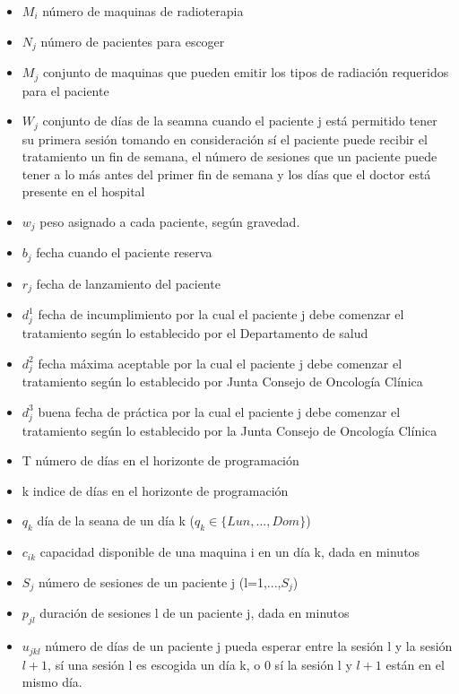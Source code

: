 \documentclass[letter, 10pt]{article}
\begin{document}
\begin{itemize}
    \item $M_{i}$ número de maquinas de radioterapia
    \item $N_{j}$ número de pacientes para escoger
    \item $M_{j}$ conjunto de maquinas que pueden emitir los tipos de radiación requeridos para el paciente
    \item $W_{j}$ conjunto de días de la seamna cuando el paciente j está permitido tener su primera sesión tomando en consideración sí el paciente puede recibir el tratamiento un fin de semana, el número de sesiones que un paciente puede tener a lo más antes del primer fin de semana y los días que el doctor está presente en el hospital
    \item $w_{j}$ peso asignado a cada paciente, según gravedad.
    \item $b_{j}$ fecha cuando el paciente reserva
    \item $r_{j}$ fecha de lanzamiento del paciente
    \item $d_{j}^{1}$ fecha de incumplimiento por la cual el paciente j debe comenzar el tratamiento según lo establecido por el Departamento
de salud
    \item $d_{j}^{2}$ fecha máxima aceptable por la cual el paciente j debe comenzar el tratamiento según lo establecido por Junta Consejo de Oncología Clínica
    \item $d_{j}^{3}$ buena fecha de práctica por la cual el paciente j debe comenzar el tratamiento según lo establecido por la Junta
Consejo de Oncología Clínica
    \item T número de días en el horizonte de programación
    \item k indice de días en el horizonte de programación
    \item $q_{k}$ día de la seana de un día k ($q_{k} \in \{Lun,...,Dom\}$)
    \item $c_{ik}$ capacidad disponible de una maquina i en un día k, dada en minutos
    \item $S_{j}$ número de sesiones de un paciente j (l=1,...,$S_{j}$)
    \item $p_{jl}$ duración de sesiones l de un paciente j, dada en minutos
    \item $u_{jkl}$ número de días de un paciente j pueda esperar entre la sesión l y la sesión $l+1$, sí una sesión l es escogida un día k, o 0 sí la sesión l y $l+1$ están en el mismo día.
\end{itemize}
\end{document}
